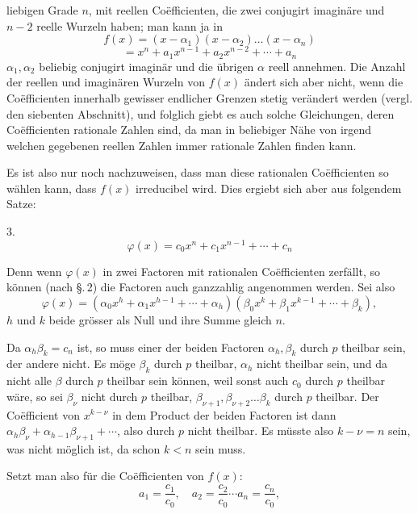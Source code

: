 liebigen Grade $n$, mit reellen Co\"efficienten, die zwei conjugirt imagin\"are und $n - 2$ reelle Wurzeln haben; man kann ja in
\[
f(x) = (x - \alpha_1)(x - \alpha_2) \ldots (x - \alpha_n)
\]
\[
= x^n + a_1 x^{n-1} + a_2 x^{n-2} + \cdots + a_n
\]
$\alpha_1, \alpha_2$ beliebig conjugirt imagin\"ar und die \"ubrigen $\alpha$ reell annehmen. Die Anzahl der reellen und imagin\"aren Wurzeln von $f(x)$ \"andert sich aber nicht, wenn die Co\"efficienten innerhalb gewisser endlicher Grenzen stetig ver\"andert werden (vergl. den siebenten Abschnitt), und folglich giebt es auch solche Gleichungen, deren Co\"efficienten rationale Zahlen sind, da man in beliebiger N\"ahe von irgend welchen gegebenen reellen Zahlen immer rationale Zahlen finden kann.

Es ist also nur noch nachzuweisen, dass man diese rationalen Co\"efficienten so w\"ahlen kann, dass $f(x)$ irreducibel wird. Dies ergiebt sich aber aus folgendem Satze:

3. 
\[
\varphi(x) = c_0 x^n + c_1 x^{n-1} + \cdots + c_n
\]

Denn wenn $\varphi(x)$ in zwei Factoren mit rationalen Co\"efficienten zerf\"allt, so k\"onnen (nach \S.\,2) die Factoren auch ganzzahlig angenommen werden. Sei also
\[
\varphi(x) = (\alpha_0 x^h + \alpha_1 x^{h-1} + \cdots + \alpha_h)(\beta_0 x^k + \beta_1 x^{k-1} + \cdots + \beta_k),
\]
$h$ und $k$ beide gr\"osser als Null und ihre Summe gleich $n$.

Da $\alpha_h \beta_k = c_n$ ist, so muss einer der beiden Factoren $\alpha_h, \beta_k$ durch $p$ theilbar sein, der andere nicht. Es m\"oge $\beta_k$ durch $p$ theilbar, $\alpha_h$ nicht theilbar sein, und da nicht alle $\beta$ durch $p$ theilbar sein k\"onnen, weil sonst auch $c_0$ durch $p$ theilbar w\"are, so sei $\beta_\nu$ nicht durch $p$ theilbar, $\beta_{\nu+1}, \beta_{\nu+2} \ldots \beta_k$ durch $p$ theilbar. Der Co\"efficient von $x^{k-\nu}$ in dem Product der beiden Factoren ist dann $\alpha_h \beta_\nu + \alpha_{h-1}\beta_{\nu+1} + \cdots$, also durch $p$ nicht theilbar. Es m\"usste also $k - \nu = n$ sein, was nicht m\"oglich ist, da schon $k < n$ sein muss.

Setzt man also f\"ur die Co\"efficienten von $f(x)$:
\[
a_1 = \frac{c_1}{c_0}, \quad a_2 = \frac{c_2}{c_0} \cdots a_n = \frac{c_n}{c_0},
\]
